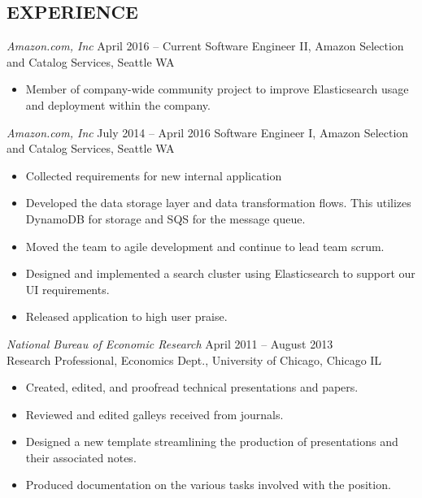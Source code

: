 \documentclass[line,margin]{res}
\begin{document}
\address{3040 17th Ave W, Unit 508, Seattle, WA 98119}
\address{(770) 833-3134\\ jake.whitaker@gmail.com}

\begin{resume}
  
  \section{EXPERIENCE}

  {\sl Amazon.com, Inc}
  \hfill April 2016 -- Current
  Software Engineer II, Amazon Selection and Catalog Services, Seattle WA
  \begin{itemize}  \itemsep-2pt
  \item Member of company-wide community project to improve Elasticsearch usage and deployment within the company.
  \end{itemize}
  
  {\sl Amazon.com, Inc}
  \hfill July 2014 -- April 2016
  Software Engineer I, Amazon Selection and Catalog Services, Seattle WA
  \begin{itemize}  \itemsep-2pt
  \item Collected requirements for new internal application
  \item Developed the data storage layer and data transformation flows.  This utilizes DynamoDB for storage and SQS for the message queue.
  \item Moved the team to agile development and continue to lead team scrum.
  \item Designed and implemented a search cluster using Elasticsearch to support our UI requirements. 
  \item Released application to high user praise.
  \end{itemize}
  
  {\sl National Bureau of Economic Research}
  \hfill April 2011 -- August 2013 \\
  Research Professional, Economics Dept., University of Chicago, Chicago IL
  \begin{itemize}  \itemsep-2pt
  \item Created, edited, and proofread technical presentations and papers.
  \item Reviewed and edited galleys received from journals.
  \item Designed a new template streamlining the production of presentations and their associated notes.
  \item Produced documentation on the various tasks involved with the position.
  \end{itemize}
  

\end{resume}
\end{document}
